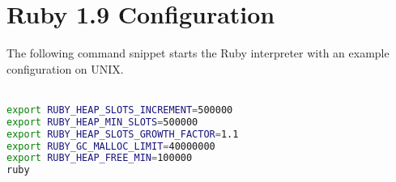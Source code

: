 \chapter{Ruby 1.9 Configuration} %
\label{ap:ruby19_configuration}

The following command snippet starts the Ruby interpreter with an example configuration on UNIX.\\\\

\begin{lstlisting}[language=bash]
export RUBY_HEAP_SLOTS_INCREMENT=500000
export RUBY_HEAP_MIN_SLOTS=500000
export RUBY_HEAP_SLOTS_GROWTH_FACTOR=1.1
export RUBY_GC_MALLOC_LIMIT=40000000
export RUBY_HEAP_FREE_MIN=100000
ruby
\end{lstlisting}
